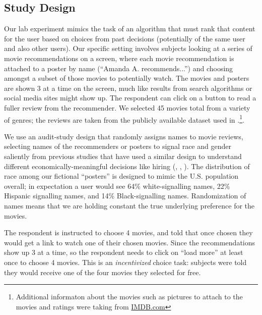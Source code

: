 \documentclass[12pt,letterpaper]{article}
\begin{document}
\subsection{Study Design}

Our lab experiment mimics the task of an algorithm that must rank that content for the user based on choices from past decisions (potentially of the same user and also other users). Our specific setting involves subjects looking at a series of movie recommendations on a screen, where each movie recommendation is attached to a poster by name (``Amanda A. recommends...'') and choosing amongst a subset of those movies to potentially watch. The movies and posters are shown 3 at a time on the screen, much like results from search algorithms or social media sites might show up. The respondent can click on a button to read a fuller review from the recommender. We selected 45 movies total from a variety of genres; the reviews are taken from the publicly available dataset used in \cite{maas2011learning}.\footnote{Additional informaton about the movies such as pictures to attach to the movies and ratings were taking from \url{IMDB.com}}. 

We use an audit-study design that randomly assigns names to movie reviews, selecting names of the recommenders or posters to signal race and gender saliently from previous studies that have used a similar design to understand different economically-meaningful decisions like hiring (\citealt{BertrandMullainathan(04)}, \citealt{agan2018ban}, \citealt{milkman2012temporal}). The distribution of race among our fictional ``posters'' is designed to mimic the U.S. population overall; in expectation a user would see 64\% white-signalling names, 22\% Hispanic signalling names, and 14\% Black-signalling names. Randomization of names means that we are holding constant the true underlying preference for the movies.

The respondent is instructed to choose 4 movies, and told that once chosen they would get a link to watch one of their chosen movies. Since the recommendations show up 3 at a time, so the respondent needs to click on ``load more'' at least once to choose 4 movies. This is an \textit{incentivized} choice task: subjects were told they would receive one of the four movies they selected for free.
\end{document}
